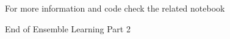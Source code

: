 \documentclass[serif, aspectratio=169]{beamer}
\begin{document}
\begin{frame}
    \begin{center}
        {\Huge\ \color{red}For more information and code check the related notebook}
    \end{center}
\end{frame}

\begin{frame}
    \begin{center}
        {\Huge\ End of Ensemble Learning Part 2}
    \end{center}
\end{frame}
\end{document}
